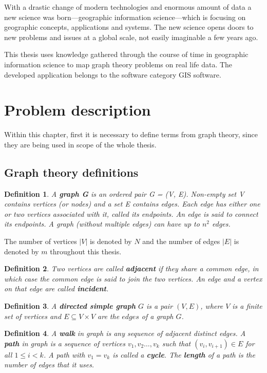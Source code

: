 \documentclass[thesis=M,english]{FITthesis}[2012/10/20]
\newtheorem{defin}{Definition}
\begin{document}
With a drastic change of modern technologies and enormous amount of data a new science was born---geographic information science---which is focusing on geographic concepts, applications and systems. The new science opens doors to new problems and issues at a global scale, not easily imaginable a few years ago. 

This thesis uses knowledge gathered through the course of time in geographic information science to map graph theory problems on real life data. The developed application belongs to the software category GIS software. 


\section{Problem description}
Within this chapter, first it is necessary to define terms from graph theory, since they are being used in scope of the whole thesis. 
\subsection{Graph theory definitions}

\begin{defin}
A \textbf{graph G} is an ordered pair G = (V, E). Non-empty set V contains
vertices (or nodes) and a set E contains edges. Each edge has either one
or two vertices associated with it, called its endpoints. An edge is said to connect its endpoints.
A graph (without multiple edges) can have up to $n^2$ edges.
\end{defin}

The number of vertices $|V|$ is denoted by $N$ and the number of edges $|E|$ is denoted by $m$ throughout this thesis. 

\begin{defin}
Two vertices are called \textbf{adjacent} if they share a common edge, in which case the common edge is said to join the two vertices. An edge and a vertex on that edge are called \textbf{incident}.
\end{defin}

\begin{defin}
A \textbf{directed simple \textit{graph}} $G$ is a pair $(V, E)$, where $V$ is a finite set of \textit{vertices} and $E \subseteq V \times V$ are the $edges$ of a graph $G$. 
\end{defin}

\begin{defin}
A \textbf{walk} in graph is any sequence of adjacent distinct edges. A \textbf{path} in graph is a sequence of vertices $v_1, v_2 \dots ,v_k$ such that $(v_i,v_{i+1}) \in E$ for all $1 \leq i < k$.  A path with $v_1 = v_k$ is called a \textbf{cycle}.  The \textbf{length} of a path is the number of edges that it uses.
\end{defin}
\end{document}
